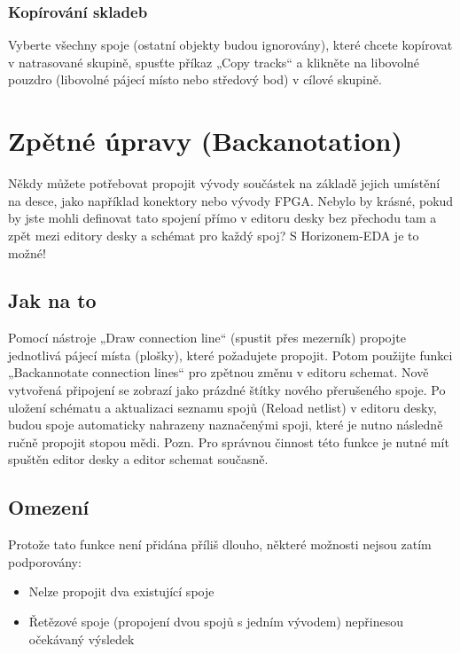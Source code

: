 \documentclass[letterpaper,10pt,czech]{sphinxmanual}
\begin{document}
\subsection{Kopírování skladeb}
\label{\detokenize{copy-layout-placement:kopirovani-skladeb}}
Vyberte všechny spoje (ostatní objekty budou ignorovány), které chcete kopírovat
v natrasované skupině, spusťte příkaz „Copy tracks“ a klikněte na libovolné pouzdro
(libovolné pájecí místo nebo středový bod) v cílové skupině.


\chapter{Zpětné úpravy (Backanotation)}
\label{\detokenize{backannotation:zpetne-upravy-backanotation}}\label{\detokenize{backannotation::doc}}
Někdy můžete potřebovat propojit vývody součástek na základě jejich
umístění na desce, jako například konektory nebo vývody FPGA. Nebylo by krásné, pokud by jste mohli definovat tato spojení přímo v editoru desky bez přechodu tam a zpět mezi editory desky a  schémat pro každý spoj? S Horizonem-EDA je to možné!


\section{Jak na to}
\label{\detokenize{backannotation:jak-na-to}}
Pomocí nástroje „Draw connection line“ (spustit přes mezerník) propojte jednotlivá pájecí místa (plošky), které požadujete propojit. Potom použijte funkci „Backannotate connection lines“ pro zpětnou změnu v editoru schemat. Nově vytvořená připojení se zobrazí jako prázdné štítky nového přerušeného spoje. Po uložení schématu a aktualizaci seznamu spojů (Reload netlist) v editoru desky, budou spoje automaticky nahrazeny naznačenými spoji, které je nutno následně ručně propojit stopou mědi. Pozn. Pro správnou činnost této funkce je nutné mít spuštěn editor desky a editor schemat současně.


\section{Omezení}
\label{\detokenize{backannotation:omezeni}}
Protože tato funkce není přidána příliš dlouho, některé možnosti nejsou zatím podporovány:
\begin{itemize}
\item {} 
Nelze propojit dva existující spoje

\item {} 
Řetězové spoje (propojení dvou spojů s jedním vývodem) nepřinesou očekávaný výsledek

\end{itemize}
\end{document}
